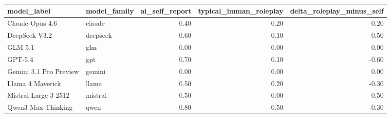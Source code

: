 \begin{tabular}{llrrr}
\toprule
model\_label & model\_family & ai\_self\_report & typical\_human\_roleplay & delta\_roleplay\_minus\_self \\
\midrule
Claude Opus 4.6 & claude & 0.40 & 0.20 & -0.20 \\
DeepSeek V3.2 & deepseek & 0.60 & 0.10 & -0.50 \\
GLM 5.1 & glm & 0.00 & 0.00 & 0.00 \\
GPT-5.4 & gpt & 0.70 & 0.10 & -0.60 \\
Gemini 3.1 Pro Preview & gemini & 0.00 & 0.00 & 0.00 \\
Llama 4 Maverick & llama & 0.50 & 0.20 & -0.30 \\
Mistral Large 3 2512 & mistral & 0.50 & 0.00 & -0.50 \\
Qwen3 Max Thinking & qwen & 0.80 & 0.50 & -0.30 \\
\bottomrule
\end{tabular}
